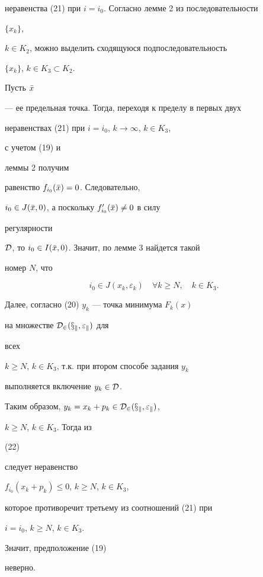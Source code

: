 \begin{pf}
неравенства (21) при $i=i_0$. Согласно лемме 2 из последовательности


$\{x_k\}$,


$k\in K_2$, можно выделить сходящуюся подпоследовательность


$\{x_k\}$, $k\in K_3\subset K_2$.


Пусть $\Bar x$


--- ее предельная точка. Тогда, переходя к пределу в первых двух


неравенствах (21) при $i=i_0$, $k\to\infty$, $k\in K_3$,


с учетом (19) и


леммы 2 получим


равенство $f_{i_0}(\Bar x)=0$. Следовательно,


$i_0\in J(\Bar x,0)$, а поскольку $f'_{i_0}(\Bar x)\ne 0$ в силу


регулярности


$\cal D$, то $i_0\in I(\Bar x,0)$. Значит, по лемме 3 найдется такой


номер $N$, что


\begin{equation}


i_0\in J(x_k,\varepsilon_k)\quad \forall k\ge N,\quad k\in K_3.


\end{equation}


Далее, согласно (20) $y_k$ --- точка минимума $F_k(x)$


на множестве $\cal D_2(x_k,\varepsilon_k)$ для


всех


$k\ge N$, $k\in K_3$, т.к. при втором способе задания $y_k$


выполняется включение $y_k\in\cal D$.


Таким образом, $y_k=x_k+p_k\in\cal D_2(x_k,\varepsilon_k)$,


$k\ge N$, $k\in K_3$. Тогда из


(22)


следует неравенство


$f_{i_0}(x_k+p_k)\le 0$, $k\ge N$, $k\in K_3$,


которое противоречит третьему из соотношений (21) при


$i=i_0$, $k\ge N$, $k\in K_3$.


Значит, предположение (19)


неверно.


\end{pf}






